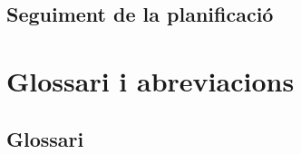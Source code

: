 \documentclass[CAT,BIB]{TFUOC}%
\begin{document}
    \section{Seguiment de la planificació}

\chapter{Glossari i abreviacions}

    \section{Glossari}

    \printglossary[type=\acronymtype, title={Abreviacions}]



\end{document}
